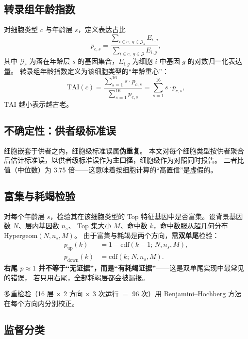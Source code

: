 \documentclass{cjc}
\newcommand{\tai}{\textrm{TAI}}
\begin{document}
\subsection{转录组年龄指数}

对细胞类型 $c$ 与年龄层 $s$，定义表达占比
\begin{equation}
  p_{c,s} = \frac{\sum_{i \in c,\; g \in \mathcal{G}_s} E_{i,g}}{\sum_{i \in c,\; g \in \mathcal{G}} E_{i,g}},
  \label{eq:pcs}
\end{equation}
其中 $\mathcal{G}_s$ 为落在年龄层 $s$ 的基因集合，$E_{i,g}$ 为细胞 $i$ 中基因 $g$ 的对数归一化表达量。
转录组年龄指数定义为该细胞类型的“年龄重心”：
\begin{equation}
  \tai(c) = \frac{\sum_{s=1}^{16} s \cdot p_{c,s}}{\sum_{s=1}^{16} p_{c,s}} = \sum_{s=1}^{16} s \cdot p_{c,s},
  \label{eq:tai}
\end{equation}
$\tai$ 越小表示越古老。

\subsection{不确定性：供者级标准误}

细胞嵌套于供者之内，细胞级标准误属\textbf{伪重复}\cite{hafemeister2019}。
本文对每个细胞类型按供者聚合后估计标准误，以供者级标准误作为\textbf{主口径}，细胞级作为对照同时报告。
二者比值（中位数）为 3.75 倍——这意味着按细胞计算的“高置信”是虚假的。

\subsection{富集与耗竭检验}

对每个年龄层 $s$，检验其在该细胞类型的 Top 特征基因中是否富集。设背景基因数 $N$、层内基因数 $n_s$、
Top 集大小 $M$、命中数 $k$，命中数服从超几何分布 $\mathrm{Hypergeom}(N, n_s, M)$。
由于富集与耗竭是两个方向，需\textbf{双单尾}检验：
\begin{align}
  p_{\text{up}}(k)   &= 1 - \mathrm{cdf}(k-1;\, N, n_s, M), \label{eq:pup}\\
  p_{\text{down}}(k) &= \mathrm{cdf}(k;\, N, n_s, M). \label{eq:pdown}
\end{align}
\textbf{右尾 $p \approx 1$ 并不等于“无证据”，而是“有耗竭证据”}——这是双单尾实现中最常见的错误，
若只用右尾，全部耗竭层都会被漏报。

多重检验（16 层 $\times$ 2 方向 $\times$ 3 次运行 $=$ 96 次）用 Benjamini--Hochberg 方法\cite{benjamini1995}
在每个方向内分别校正。

\subsection{监督分类}
\end{document}
